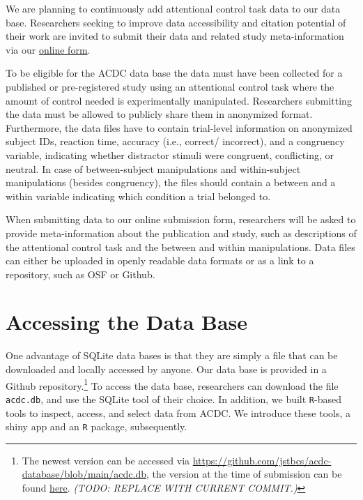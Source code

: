 \documentclass[
  man,floatsintext]{apa6}
\begin{document}
We are planning to continuously add attentional control task data to our data base. Researchers seeking to improve data accessibility and citation potential of their work are invited to submit their data and related study meta-information via our \href{https://www.ampl-psych.com/attentional-control-data-collection-acdc/}{online form}.

To be eligible for the ACDC data base the data must have been collected for a published or pre-registered study using an attentional control task where the amount of control needed is experimentally manipulated. Researchers submitting the data must be allowed to publicly share them in anonymized format. Furthermore, the data files have to contain trial-level information on anonymized subject IDs, reaction time, accuracy (i.e., correct/ incorrect), and a congruency variable, indicating whether distractor stimuli were congruent, conflicting, or neutral. In case of between-subject manipulations and within-subject manipulations (besides congruency), the files should contain a between and a within variable indicating which condition a trial belonged to.

When submitting data to our online submission form, researchers will be asked to provide meta-information about the publication and study, such as descriptions of the attentional control task and the between and within manipulations. Data files can either be uploaded in openly readable data formats or as a link to a repository, such as OSF or Github.

\hypertarget{accessing-the-data-base}{%
\section{Accessing the Data Base}\label{accessing-the-data-base}}

One advantage of SQLite data bases is that they are simply a file that can be downloaded and locally accessed by anyone. Our data base is provided in a Github repository.\footnote{The newest version can be accessed via \url{https://github.com/jstbcs/acdc-database/blob/main/acdc.db}, the version at the time of submission can be found \href{https://github.com/jstbcs/acdc-database/blob/main/acdc.db}{here}. \emph{ (TODO: REPLACE WITH CURRENT COMMIT.)}} To access the data base, researchers can download the file \texttt{acdc.db}, and use the SQLite tool of their choice. In addition, we built \texttt{R}-based tools to inspect, access, and select data from ACDC. We introduce these tools, a shiny app and an \texttt{R} package, subsequently.
\end{document}
